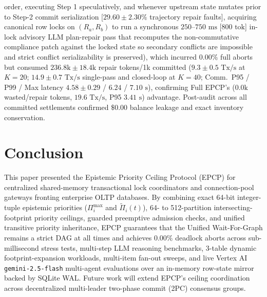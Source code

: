 \documentclass[conference,10pt]{IEEEtran}
\begin{document}
\begin{enumerate}
order, executing Step 1 speculatively, and whenever upstream state mutates prior to Step-2 commit serialization [$29.60 \pm 2.30\%$ trajectory repair faults], acquiring canonical row locks on $(R_a, R_b)$ to run a synchronous $250\text{--}750\text{ ms}$ [$800\text{ tok}$] in-lock advisory LLM plan-repair pass that recomputes the non-commutative compliance patch against the locked state so secondary conflicts are impossible and strict conflict serializability is preserved), which incurred $0.00\%$ full aborts but consumed $236.8\text{k} \pm 18.4\text{k}$ repair tokens/1k committed ($9.3 \pm 0.5\text{ Tx/s}$ at $K=20$; $14.9 \pm 0.7\text{ Tx/s}$ single-pass and closed-loop at $K=40$; Comm.\ P95 / P99 / Max latency $4.58 \pm 0.29$ / $6.24$ / $7.10\text{ s}$), confirming Full EPCP's ($0.0\text{k}$ wasted/repair tokens, $19.6\text{ Tx/s}$, P95 $3.41\text{ s}$) advantage. Post-audit across all committed settlements confirmed $\$0.00$ balance leakage and exact inventory conservation.
\end{enumerate}

\section{Conclusion}
This paper presented the Epistemic Priority Ceiling Protocol (EPCP) for centralized shared-memory transactional lock coordinators and connection-pool gateways fronting enterprise OLTP databases. By combining exact 64-bit integer-tuple epistemic priorities ($\Pi_i^{\max}$ and $\tilde{\Pi}_i(t)$), 64- to 512-partition intersecting-footprint priority ceilings, guarded preemptive admission checks, and unified transitive priority inheritance, EPCP guarantees that the Unified Wait-For-Graph remains a strict DAG at all times and achieves $0.00\%$ deadlock aborts across sub-millisecond stress tests, multi-step LLM reasoning benchmarks, 3-table dynamic footprint-expansion workloads, multi-item fan-out sweeps, and live Vertex AI \texttt{gemini-2.5-flash} multi-agent evaluations over an in-memory row-state mirror backed by SQLite WAL. Future work will extend EPCP's ceiling coordination across decentralized multi-leader two-phase commit (2PC) consensus groups.
\end{document}
